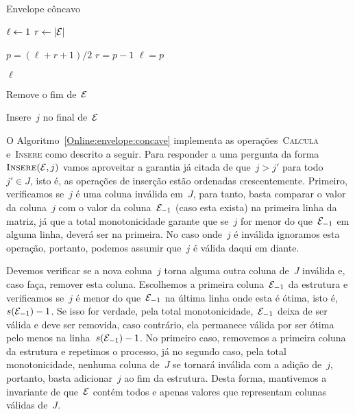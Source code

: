 \begin{algorithm}[h]
\caption{Envelope côncavo}
\label{Online:envelope:concave}
\begin{algorithmic}[1]
    \State $\ell \leftarrow 1$
    \State $r \leftarrow |\mathcal{E}|$
    
        \State $p = (\ell+r+1)/2$
            \State $r = p - 1$
        \Else
            \State $\ell = p$
        \EndIf
    \EndWhile

    \State \Return $\ell$
\EndFunction

        \State \Return
    \EndIf
    
        \State Remove o fim de~$\mathcal{E}$
    \EndWhile

    \State Insere~$j$ no final de~$\mathcal{E}$
\EndFunction
\end{algorithmic}
\end{algorithm}

O Algoritmo~\ref{Online:envelope:concave} implementa as operações~\textsc{Calcula} e~\textsc{Insere} como descrito a seguir. Para responder a uma pergunta da forma~$\textsc{Insere}(\mathcal{E},j)$ vamos aproveitar a garantia já citada de que~$j > j'$ para todo~$j' \in J$, isto é, as operações de inserção estão ordenadas crescentemente. Primeiro, verificamos se~$j$ é uma coluna inválida em~$J$, para tanto, basta comparar o valor da coluna~$j$ com o valor da coluna~$\mathcal{E}_{-1}$ (caso esta exista) na primeira linha da matriz, já que a total monotonicidade garante que se~$j$ for menor do que~$\mathcal{E}_{-1}$ em alguma linha, deverá ser na primeira. No caso onde~$j$ é inválida ignoramos esta operação, portanto, podemos assumir que~$j$ é válida daqui em diante.

Devemos verificar se a nova coluna~$j$ torna alguma outra coluna de~$J$ inválida e, caso faça, remover esta coluna. Escolhemos a primeira coluna~$\mathcal{E}_{-1}$ da estrutura e verificamos se~$j$ é menor do que~$\mathcal{E}_{-1}$ na última linha onde esta é ótima, isto é,~$s(\mathcal{E}_{-1}) - 1$. Se isso for verdade, pela total monotonicidade,~$\mathcal{E}_{-1}$ deixa de ser válida e deve ser removida, caso contrário, ela permanece válida por ser ótima pelo menos na linha~$s(\mathcal{E}_{-1}) - 1$. No primeiro caso, removemos a primeira coluna da estrutura e repetimos o processo, já no segundo caso, pela total monotonicidade, nenhuma coluna de~$J$ se tornará inválida com a adição de~$j$, portanto, basta adicionar~$j$ ao fim da estrutura. Desta forma, mantivemos a invariante de que~$\mathcal{E}$ contém todos e apenas valores que representam colunas válidas de~$J$.


